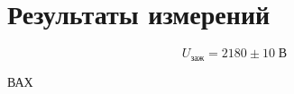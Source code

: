 \section{Результаты измерений}
\[
    U_{\text{заж}} = 2180\pm10\;\text{В}
\]

\begin{table}[!ht]
    \centering
    \caption{ВАХ}
    
\end{table}

\begin{figure}[ht!]
\end{figure}
\begin{figure}[ht!]
\end{figure}
\begin{figure}[ht!]
\end{figure}

